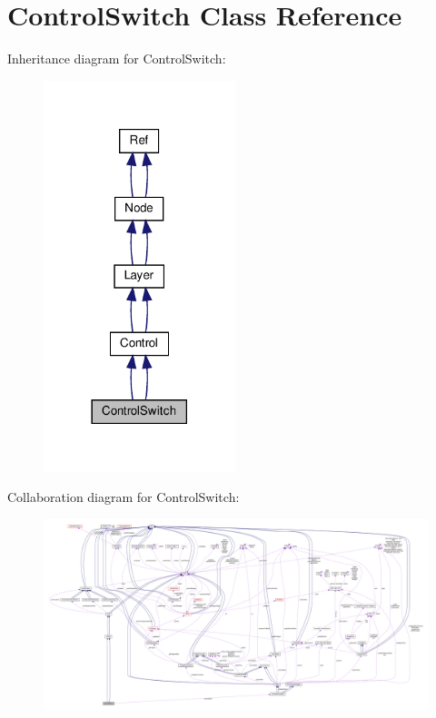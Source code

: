 \hypertarget{classControlSwitch}{}\section{Control\+Switch Class Reference}
\label{classControlSwitch}


Inheritance diagram for Control\+Switch\+:
\nopagebreak
\begin{figure}[H]
\begin{center}
\leavevmode
\includegraphics[width=158pt]{classControlSwitch__inherit__graph}
\end{center}
\end{figure}


Collaboration diagram for Control\+Switch\+:
\nopagebreak
\begin{figure}[H]
\begin{center}
\leavevmode
\includegraphics[width=350pt]{classControlSwitch__coll__graph}
\end{center}
\end{figure}
